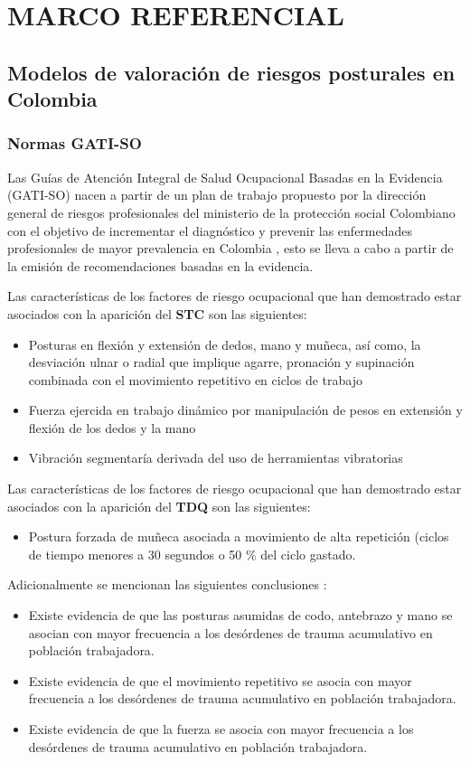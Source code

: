 \section{MARCO REFERENCIAL}
\subsection{Modelos de valoración de riesgos posturales en Colombia}
\subsubsection{Normas GATI-SO}
Las Guías de Atención Integral de Salud Ocupacional Basadas en la Evidencia (GATI-SO) nacen a partir de un plan de trabajo propuesto por la dirección general de riesgos profesionales del ministerio de la protección social Colombiano con el objetivo de incrementar el diagnóstico y prevenir las enfermedades profesionales de
mayor prevalencia en Colombia \parencite[6]{MinisteriodeProteccionSocialdeColombia2006GuiaSuperiores}, esto se lleva a cabo a partir de la emisión de recomendaciones basadas en la evidencia.

Las características de los factores de riesgo ocupacional que han demostrado estar asociados con la aparición del \textbf{STC} son las siguientes:\parencite[45]{MinisteriodeProteccionSocialdeColombia2006GuiaSuperiores}
\begin{itemize}
\item Posturas en flexión y extensión de dedos, mano y muñeca, así como, la desviación ulnar o radial que implique agarre, pronación y supinación combinada con el movimiento repetitivo en ciclos de trabajo
\item Fuerza ejercida en trabajo dinámico por manipulación de pesos en extensión y flexión de los dedos y la mano
\item Vibración segmentaría derivada del uso de herramientas vibratorias
\end{itemize}
Las características de los factores de riesgo ocupacional que han demostrado estar asociados con la aparición del \textbf{TDQ} son las siguientes\parencite[45]{MinisteriodeProteccionSocialdeColombia2006GuiaSuperiores}:
\begin{itemize}
\item Postura forzada de muñeca asociada a movimiento de alta repetición (ciclos de tiempo menores a 30 segundos o 50 \% del ciclo gastado.
\end{itemize}
Adicionalmente se mencionan las siguientes conclusiones \parencite[46]{MinisteriodeProteccionSocialdeColombia2006GuiaSuperiores}:
\begin{itemize}
\item Existe evidencia de que las posturas asumidas de codo, antebrazo y mano se asocian con mayor frecuencia a los desórdenes de trauma acumulativo en población trabajadora.
\item Existe evidencia de que el movimiento repetitivo se asocia con mayor frecuencia a los desórdenes de trauma acumulativo en población trabajadora.
\item Existe evidencia de que la fuerza se asocia con mayor frecuencia a los desórdenes de trauma acumulativo en población trabajadora.
\end{itemize}

